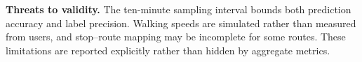 \textbf{Threats to validity.} The ten-minute sampling interval bounds both prediction accuracy and label precision. Walking speeds are simulated rather than measured from users, and stop--route mapping may be incomplete for some routes. These limitations are reported explicitly rather than hidden by aggregate metrics.
